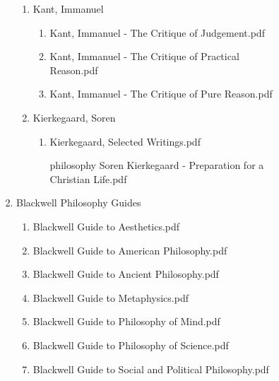 \documentclass[11pt]{article}
\begin{document}
\begin{enumerate}
\begin{enumerate}
\begin{enumerate}
\begin{enumerate}
\begin{enumerate}
\begin{enumerate}
\item Kant, Immanuel
\label{sec-1-1-1-1-7-3-39-13-40}
\begin{enumerate}
\item Kant, Immanuel - The Critique of Judgement.pdf
\label{sec-1-1-1-1-7-3-39-13-40-1}

\item Kant, Immanuel - The Critique of Practical Reason.pdf
\label{sec-1-1-1-1-7-3-39-13-40-2}

\item Kant, Immanuel - The Critique of Pure Reason.pdf
\label{sec-1-1-1-1-7-3-39-13-40-3}
\end{enumerate}

\item Kierkegaard, Soren
\label{sec-1-1-1-1-7-3-39-13-41}
\begin{enumerate}
\item Kierkegaard, Selected Writings.pdf
\label{sec-1-1-1-1-7-3-39-13-41-1}

\item [philosophy] Soren Kierkegaard - Preparation for a Christian Life.pdf
\label{sec-1-1-1-1-7-3-39-13-41-2}
\end{enumerate}
\end{enumerate}

\item Blackwell Philosophy Guides
\label{sec-1-1-1-1-7-3-39-14}
\begin{enumerate}
\item Blackwell Guide to Aesthetics.pdf
\label{sec-1-1-1-1-7-3-39-14-1}

\item Blackwell Guide to American Philosophy.pdf
\label{sec-1-1-1-1-7-3-39-14-2}

\item Blackwell Guide to Ancient Philosophy.pdf
\label{sec-1-1-1-1-7-3-39-14-3}

\item Blackwell Guide to Metaphysics.pdf
\label{sec-1-1-1-1-7-3-39-14-4}

\item Blackwell Guide to Philosophy of Mind.pdf
\label{sec-1-1-1-1-7-3-39-14-5}

\item Blackwell Guide to Philosophy of Science.pdf
\label{sec-1-1-1-1-7-3-39-14-6}

\item Blackwell Guide to Social and Political Philosophy.pdf
\label{sec-1-1-1-1-7-3-39-14-7}


\end{enumerate}
\end{enumerate}
\end{enumerate}
\end{enumerate}
\end{enumerate}
\end{enumerate}
\end{document}

